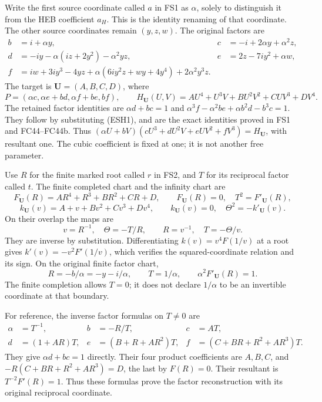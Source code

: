 \documentclass[
  10pt,
  a4paper,
]{article}
\begin{document}
Write the first source coordinate called \(a\) in FS1 as \(\alpha\),
solely to distinguish it from the HEB coefficient \(a_H\). This is the
identity renaming of that coordinate. The other source coordinates
remain \((y,z,w)\). The original factors are \[
\begin{aligned}
b&=i+\alpha y,&c&=-i+2\alpha y+\alpha^2z,\\
d&=-iy-\alpha(iz+2y^2)-\alpha^2yz,&
e&=2z-7iy^2+\alpha w,\\
f&=iw+3iy^3-4yz+\alpha(6iy^2z+wy+4y^4)+2\alpha^2y^3z.
\end{aligned}
\tag{ESH1}
\] The target is \(\mathbf U=(A,B,C,D)\), where \[
P=(\alpha c,\alpha e+bd,\alpha f+be,bf),\qquad
H_{\mathbf U}(U,V)=AU^4+U^3V+BU^2V^2+CUV^3+DV^4.
\tag{ESH2}
\] The retained factor identities are \(\alpha d+bc=1\) and
\(\alpha^3f-\alpha^2be+\alpha b^2d-b^3c=1\). They follow by substituting
(ESH1), and are the exact identities proved in FS1 and FC44--FC44b. Thus
\((\alpha U+bV)(cU^3+dU^2V+eUV^2+fV^3)=H_{\mathbf U}\), with resultant
one. The cubic coefficient is fixed at one; it is not another free
parameter.

Use \(R\) for the finite marked root called \(r\) in FS2, and \(T\) for
its reciprocal factor called \(t\). The finite completed chart and the
infinity chart are \[
F_{\mathbf U}(R)=AR^4+R^3+BR^2+CR+D,
\qquad F_{\mathbf U}(R)=0,\quad T^2=F'_{\mathbf U}(R),
\tag{ESH3}
\] \[
k_{\mathbf U}(v)=A+v+Bv^2+Cv^3+Dv^4,
\qquad k_{\mathbf U}(v)=0,\quad \Theta^2=-k'_{\mathbf U}(v).
\tag{ESH4}
\] On their overlap the maps are \[
v=R^{-1},\quad \Theta=-T/R,\qquad
R=v^{-1},\quad T=-\Theta/v.
\tag{ESH5}
\] They are inverse by substitution. Differentiating \(k(v)=v^4F(1/v)\)
at a root gives \(k'(v)=-v^2F'(1/v)\), which verifies the
squared-coordinate relation and its sign. On the original finite factor
chart, \[
R=-b/\alpha=-y-i/\alpha,\qquad T=1/\alpha,
\qquad \alpha^2F'_{\mathbf U}(R)=1.
\tag{ESH6}
\] The finite completion allows \(T=0\); it does not declare
\(1/\alpha\) to be an invertible coordinate at that boundary.

For reference, the inverse factor formulas on \(T\ne0\) are \[
\begin{aligned}
\alpha&=T^{-1},&b&=-R/T,&c&=AT,\\
d&=(1+AR)T,&e&=(B+R+AR^2)T,&
f&=(C+BR+R^2+AR^3)T.
\end{aligned}
\tag{ESH7}
\] They give \(\alpha d+bc=1\) directly. Their four product coefficients
are \(A,B,C\), and \(-R(C+BR+R^2+AR^3)=D\), the last by \(F(R)=0\).
Their resultant is \(T^{-2}F'(R)=1\). Thus these formulas prove the
factor reconstruction with its original reciprocal coordinate.
\end{document}
